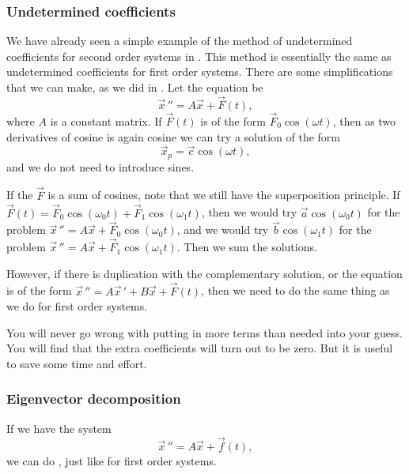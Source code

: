 \documentclass[12pt]{book}
\begin{document}
\subsubsection{Undetermined coefficients}

We have already seen a simple example of the method
of undetermined coefficients
for second order systems in .
This method is essentially the same as undetermined coefficients for first
order systems.
There are some simplifications that we can make, as we did in 
.  Let the equation be
\begin{equation*}
{\vec{x}\,}'' = A \vec{x} + \vec{F}(t) ,
\end{equation*}
where $A$ is a constant matrix.  If $\vec{F}(t)$ is of the form
$\vec{F}_0 \cos (\omega t)$, then as two derivatives of cosine is again
cosine we can try a solution of the form
\begin{equation*}
\vec{x}_p = \vec{c} \cos (\omega t) ,
\end{equation*}
and we do not need to introduce sines.

If the $\vec{F}$ is a sum of
cosines, note that we still have the superposition principle.
If $\vec{F}(t) =
\vec{F}_0 \cos (\omega_0 t) + 
\vec{F}_1 \cos (\omega_1 t)$, then we would try
$\vec{a} \cos (\omega_0 t)$ for the problem
${\vec{x}\,}'' = A \vec{x} + \vec{F}_0 \cos (\omega_0 t)$, and we would try
$\vec{b} \cos (\omega_1 t)$ for the problem
${\vec{x}\,}'' = A \vec{x} + \vec{F}_1 \cos (\omega_1 t)$.  Then we sum the
solutions.

However, if there is duplication with the
complementary solution, or the equation is of the form
${\vec{x}\,}'' = A{\vec{x}\,}'+ B \vec{x} + \vec{F}(t)$, then we need
to do the same thing as we do for first order systems.

You will never go wrong with putting in more terms than needed into
your guess.  You will find that the extra coefficients will turn out to
be zero.  But it is useful to save some time and effort.

\subsubsection{Eigenvector decomposition}

If we have the system
\begin{equation*}
{\vec{x}\,}'' = A \vec{x} + \vec{f}(t) ,
\end{equation*}
we can do \emph{}, just like for first
order systems.
\end{document}
